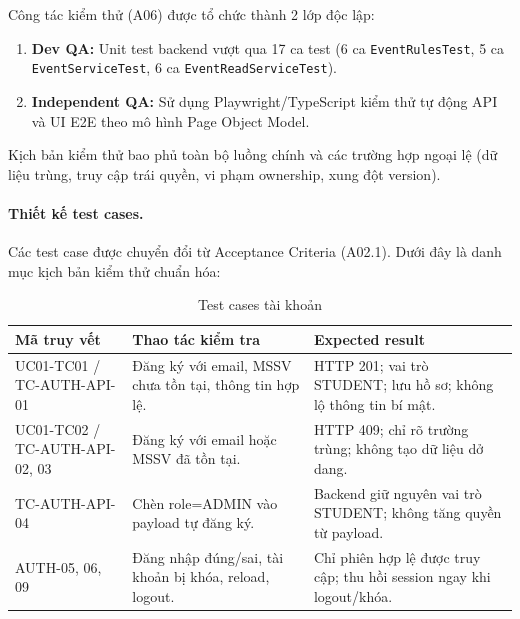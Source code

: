 
Công tác kiểm thử (A06) được tổ chức thành 2 lớp độc lập:
\begin{enumerate}
    \item \textbf{Dev QA:} Unit test backend vượt qua 17 ca test (6 ca \texttt{EventRulesTest}, 5 ca \texttt{EventServiceTest}, 6 ca \texttt{EventReadServiceTest}).
    \item \textbf{Independent QA:} Sử dụng Playwright/TypeScript kiểm thử tự động API và UI E2E theo mô hình Page Object Model.
\end{enumerate}

Kịch bản kiểm thử bao phủ toàn bộ luồng chính và các trường hợp ngoại lệ (dữ liệu trùng, truy cập trái quyền, vi phạm ownership, xung đột version).

\paragraph{Thiết kế test cases.}
Các test case được chuyển đổi từ Acceptance Criteria (A02.1). Dưới đây là danh mục kịch bản kiểm thử chuẩn hóa:

\begin{table}[H]
\centering\small
\caption{Test cases tài khoản}\label{tab:i1-auth-cases}
\begin{tabularx}{\linewidth}{@{}p{.22\linewidth}XX@{}}
\toprule
\textbf{Mã truy vết} & \textbf{Thao tác kiểm tra} & \textbf{Expected result}\\\midrule
UC01-TC01 / TC-AUTH-API-01 & Đăng ký với email, MSSV chưa tồn tại, thông tin hợp lệ. & HTTP 201; vai trò STUDENT; lưu hồ sơ; không lộ thông tin bí mật.\\
UC01-TC02 / TC-AUTH-API-02, 03 & Đăng ký với email hoặc MSSV đã tồn tại. & HTTP 409; chỉ rõ trường trùng; không tạo dữ liệu dở dang.\\
TC-AUTH-API-04 & Chèn role=ADMIN vào payload tự đăng ký. & Backend giữ nguyên vai trò STUDENT; không tăng quyền từ payload.\\
AUTH-05, 06, 09 & Đăng nhập đúng/sai, tài khoản bị khóa, reload, logout. & Chỉ phiên hợp lệ được truy cập; thu hồi session ngay khi logout/khóa.\\
\bottomrule\end{tabularx}
\end{table}

